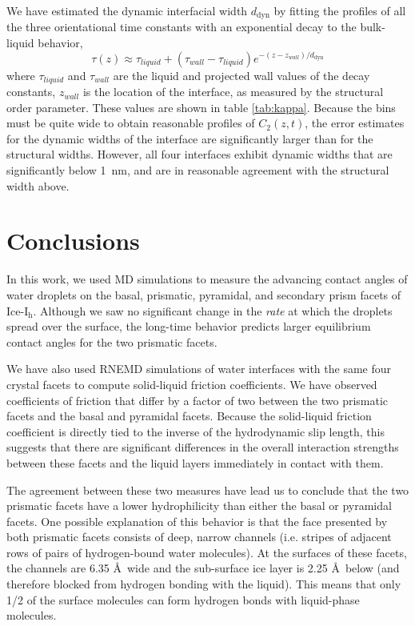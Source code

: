 We have estimated the dynamic interfacial width $d_\mathrm{dyn}$ by
fitting the profiles of all the three orientational time constants
with an exponential decay to the bulk-liquid behavior,
\begin{equation}\label{tauFit}
  \tau(z)\approx\tau_{liquid}+(\tau_{wall}-\tau_{liquid})e^{-(z-z_{wall})/d_\mathrm{dyn}}
\end{equation}
where $\tau_{liquid}$ and $\tau_{wall}$ are the liquid and projected
wall values of the decay constants, $z_{wall}$ is the location of the
interface, as measured by the structural order parameter.  These
values are shown in table \ref{tab:kappa}. Because the bins must be
quite wide to obtain reasonable profiles of $C_2(z,t)$, the error
estimates for the dynamic widths of the interface are significantly
larger than for the structural widths.  However, all four interfaces
exhibit dynamic widths that are significantly below 1~nm, and are in
reasonable agreement with the structural width above.

\section{Conclusions}
In this work, we used MD simulations to measure the advancing contact
angles of water droplets on the basal, prismatic, pyramidal, and
secondary prism facets of Ice-I$_\mathrm{h}$.  Although we saw no
significant change in the \textit{rate} at which the droplets spread
over the surface, the long-time behavior predicts larger equilibrium
contact angles for the two prismatic facets.  

We have also used RNEMD simulations of water interfaces with the same
four crystal facets to compute solid-liquid friction coefficients.  We
have observed coefficients of friction that differ by a factor of two
between the two prismatic facets and the basal and pyramidal facets.
Because the solid-liquid friction coefficient is directly tied to the
inverse of the hydrodynamic slip length, this suggests that there are
significant differences in the overall interaction strengths between
these facets and the liquid layers immediately in contact with them.

The agreement between these two measures have lead us to conclude that
the two prismatic facets have a lower hydrophilicity than either the
basal or pyramidal facets.  One possible explanation of this behavior
is that the face presented by both prismatic facets consists of deep,
narrow channels (i.e. stripes of adjacent rows of pairs of
hydrogen-bound water molecules).  At the surfaces of these facets,
the channels are 6.35 \AA\ wide and the sub-surface ice layer is 2.25
\AA\ below (and therefore blocked from hydrogen bonding with the
liquid).  This means that only 1/2 of the surface molecules can form
hydrogen bonds with liquid-phase molecules.

